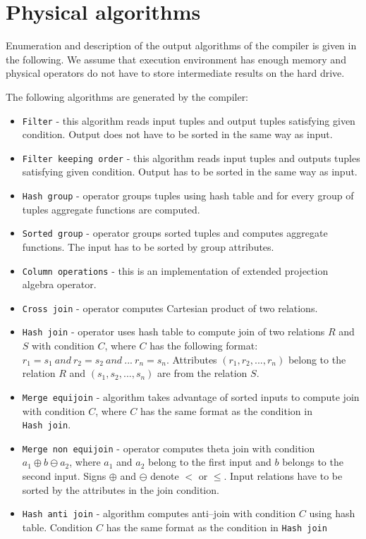 \section{Physical algorithms}


Enumeration and description of the output algorithms of the compiler is given in the following.
We assume that execution environment has enough memory and physical operators do not have to store intermediate results on the hard drive.

The following algorithms are generated by the compiler:
\begin{itemize}
\item \texttt{Filter} - this algorithm reads input tuples and output tuples satisfying given condition. Output does not have to be sorted in the same way as input.
\item \texttt{Filter~keeping~order} - this algorithm reads input tuples and outputs tuples satisfying given condition. Output has to be sorted in the same way as input.
\item \texttt{Hash~group} - operator groups tuples using hash table and for every group of tuples aggregate functions are computed.
\item \texttt{Sorted~group} - operator groups sorted tuples and computes aggregate functions. The input has to be sorted by group attributes.
\item \texttt{Column~operations} - this is an implementation of extended projection algebra operator. 
\item \texttt{Cross~join} - operator computes Cartesian product of two relations.
\item \texttt{Hash~join} - operator uses hash table to compute join of two relations $R$ and $S$ with condition $C$, where $C$ has the following format: $r_1=s_1~and~r_2=s_2~and~...~r_n=s_n$. Attributes $(r_1,r_2,...,r_n)$ belong to the relation $R$ and $(s_1,s_2,...,s_n)$ are from the relation $S$.
\item \texttt{Merge~equijoin} - algorithm takes advantage of sorted inputs to compute join with condition $C$, where $C$ has the same format as the condition in \texttt{Hash~join}. 
\item \texttt{Merge~non~equijoin} - operator computes theta join with condition $a_1\oplus b \ominus a_2$, where $a_1$ and $a_2$ belong to the first input and $b$ belongs to the second input. Signs $\oplus$ and $\ominus$ denote $<$ or $\leq$. Input relations have to be sorted by the attributes in the join condition.
\item \texttt{Hash~anti~join} -  algorithm computes anti--join with condition $C$  using hash table. Condition $C$ has the same format as the condition in \texttt{Hash~join}

\end{itemize}
